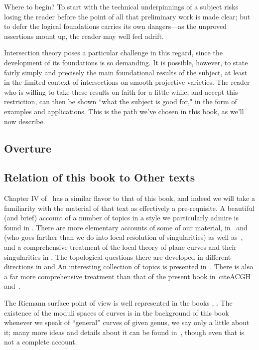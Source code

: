 Where to begin? To start with the technical underpinnings of a subject risks losing the reader before the point of all that preliminary work is made clear; but to defer the logical foundations carries its own dangers---as the unproved assertions mount up, the reader may well feel adrift.

Intersection theory poses a particular challenge in this regard, since the development of its foundations is so demanding. It is possible, however, to state fairly simply and precisely the main foundational results of the subject, at least in the limited context of intersections on smooth projective varieties. The reader who is willing to take these results on faith for a little while, and accept this restriction, can then be shown ``what the subject is good for," in the form of examples and applications. This is the path we've chosen in this book, as we'll now describe.

\subsection{Overture}



\subsection{Relation of this book to Other texts} 
Chapter IV of~\cite{Hartshorne1977} has a similar flavor to that of this book, and indeed we will take a familiarity with the material of that text as effectively a pre-requisite. A beautiful (and brief) account of a number of topics in a style we particularly admire is found in \cite{MumfordCJ}.
There are more elementary accounts of some of our material, in~\cite{Fulton1989} and \cite{Walker1978} (who goes farther than we do into local resolution of singularities) as well as~\cite{Griffiths-curves}, and a comprehensive treatment of the local theory of plane curves and their singularities in \cite{Brieskorn1986}. The topological questions there are developed in different directions in \cite{MR0239612} %
 and \cite{MR817982}%
 An interesting collection of topics is presented in~\cite{Clemens-Scrapbook}.
There is also a far more comprehensive treatment than that of the present book in~cite{ACGH} and~\cite{ACGH-2}.

 The Riemann surface point of view is well represented in the books \cite{Forster} \cite{Gunning}, \cite{Gunning-2} \cite{Kirwan}\cite{Miranda}. The existence of the moduli spaces of curves is in the background of this book whenever we speak of ``general'' curves of given genus, we say only a little about it; many more ideas and details about it can be found in~\cite{HarrisMorrison1998}, though even that is not a complete account.


